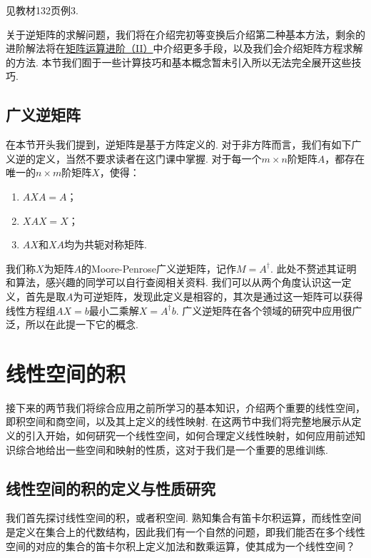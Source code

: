 \begin{solution}
    见教材132页例3.
\end{solution}

关于逆矩阵的求解问题，我们将在介绍完初等变换后介绍第二种基本方法，剩余的进阶解法将在\hyperref[chap:矩阵运算进阶（II）]{矩阵运算进阶（II）}中介绍更多手段，以及我们会介绍矩阵方程求解的方法. 本节我们囿于一些计算技巧和基本概念暂未引入所以无法完全展开这些技巧.

\subsection{广义逆矩阵}

在本节开头我们提到，逆矩阵是基于方阵定义的. 对于非方阵而言，我们有如下广义逆的定义，当然不要求读者在这门课中掌握. 对于每一个$m \times n$阶矩阵$A$，都存在唯一的$n \times m$阶矩阵$X$，使得：
\begin{enumerate}
    \item $AXA=A$；

    \item $XAX=X$；

    \item $AX$和$XA$均为共轭对称矩阵.
\end{enumerate}
我们称$X$为矩阵$A$的Moore-Penrose广义逆矩阵，记作$M=A^\dagger$. 此处不赘述其证明和算法，感兴趣的同学可以自行查阅相关资料. 我们可以从两个角度认识这一定义，首先是取$A$为可逆矩阵，发现此定义是相容的，其次是通过这一矩阵可以获得线性方程组$AX=b$最小二乘解$X=A^\dagger b$. 广义逆矩阵在各个领域的研究中应用很广泛，所以在此提一下它的概念.

\section{线性空间的积}

接下来的两节我们将综合应用之前所学习的基本知识，介绍两个重要的线性空间，即积空间和商空间，以及其上定义的线性映射. 在这两节中我们将完整地展示从定义的引入开始，如何研究一个线性空间，如何合理定义线性映射，如何应用前述知识综合地给出一些空间和映射的性质，这对于我们是一个重要的思维训练.

\subsection{线性空间的积的定义与性质研究}

我们首先探讨线性空间的积，或者积空间. 熟知集合有笛卡尔积运算，而线性空间是定义在集合上的代数结构，因此我们有一个自然的问题，即我们能否在多个线性空间的对应的集合的笛卡尔积上定义加法和数乘运算，使其成为一个线性空间？

